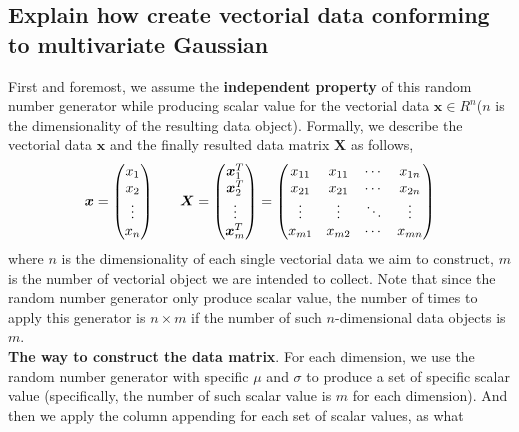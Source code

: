 \documentclass[11pt,a4paper]{article}
\newcommand{\htab}{\hspace*{0.63cm}}
\newcommand{\bs}[1]{\boldsymbol{#1}}
\begin{document}
\subsection{Explain how create vectorial data conforming to multivariate Gaussian}
\newcommand{\sigmai}{\sigma_{i}}
\newcommand{\mui}{\mu_{i}}
\newcommand{\C}{\mathbf{C}}
\htab First and foremost, we assume the \textbf{independent property} of this random number generator while producing scalar value for the vectorial data $\bs{x} \in R^{n}$($n$ is the dimensionality of the resulting data object). Formally, we describe the vectorial data $\bs{x}$ and the finally resulted data matrix $\bs{X}$ as follows,
    \begin{align}
        \bs{x} = \begin{pmatrix}
            x_{1} \\ x_{2} \\ \vdots \\ x_{n}
            \end{pmatrix} \htab
        \bs{X} = \begin{pmatrix}
            \bs{x}_{1}^{T} \\ \bs{x}_{2}^{T} \\ \vdots \\ \bs{x}_{m}^{T}
            \end{pmatrix}
            \label{1:formalisation}
        = \begin{pmatrix}
            x_{11} & x_{11}& \cdots& x_{1n} \\ 
            x_{21} & x_{21}& \cdots& x_{2n} \\ 
            \vdots & \vdots& \ddots& \vdots \\ 
            x_{m1} & x_{m2}& \cdots& x_{mn}
            \end{pmatrix}
    \end{align}
\htab where $n$ is the dimensionality of each single vectorial data we aim to construct, 
$m$ is the number of vectorial object we are intended to collect. 
Note that since the random number generator only produce scalar value, 
the number of times to apply this generator is $n\times m$ if the number of 
such $n$-dimensional data objects is $m$.\\
\htab \textbf{The way to construct the data matrix}. For each dimension, we use the random 
number generator with specific $\mu$ and $\sigma$ to produce a set of specific scalar 
value (specifically, the number of such scalar value is $m$ for each dimension). 
And then we apply the column appending for each set of scalar values, as what
\end{document}
